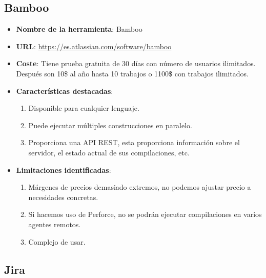 \subsection{Bamboo}

\begin{itemize}
	\item \textbf{Nombre de la herramienta}: Bamboo
	\item \textbf{URL}: \url{https://es.atlassian.com/software/bamboo}
	\item \textbf{Coste}: Tiene prueba gratuita de 30 días con número de usuarios ilimitados. Después son 10\$ al año hasta 10 trabajos o 1100\$ con trabajos ilimitados.
	\item \textbf{Características destacadas}:
	\begin{enumerate}
		\item Disponible para cualquier lenguaje.
		\item Puede ejecutar múltiples construcciones en paralelo.
		\item Proporciona una API REST, esta proporciona información sobre el servidor, el estado actual de sus compilaciones, etc.
	\end{enumerate}
	\item \textbf{Limitaciones identificadas}:
	\begin{enumerate}
		\item Márgenes de precios demasiado extremos, no podemos ajustar precio a necesidades concretas.
		\item Si hacemos uso de Perforce, no se podrán ejecutar compilaciones en varios agentes remotos.
		\item Complejo de usar.
	\end{enumerate}
\end{itemize}

\subsection{Jira}

